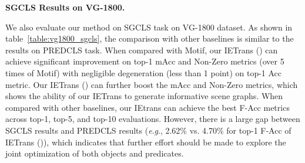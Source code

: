 \documentclass[runningheads]{llncs}
\newcommand{\eg}{\textit{e}.\textit{g}.}
\begin{document}
\smallskip
\noindent
\textbf{SGCLS Results on VG-1800.}
\begin{table*}
    \caption{SGCLS triplet-level evaluation results on VG-1800 dataset.}
    \begin{center}
    \small
    \end{center}
    \label{table:vg1800_sgcls}
\end{table*}
We also evaluate our method on SGCLS task on VG-1800 dataset.
As shown in table~\ref{table:vg1800_sgcls}, the comparison with other baselines is similar to the results on PREDCLS task.
When compared with Motif, our IETrans () can achieve significant improvement on top-1 mAcc and Non-Zero metrics (over 5 times of Motif) with negligible degeneration (less than 1 point) on top-1 Acc metric.
Our IETrans () can further boost the mAcc and Non-Zero metrics, which shows the ability of our IETrans to generate informative scene graphs.
When compared with other baselines, our IEtrans can achieve the best F-Acc metrics across top-1, top-5, and top-10 evaluations.
However, there is a large gap between SGCLS results and PREDCLS results (\eg, 2.62\% vs. 4.70\% for top-1 F-Acc of IETrans ()), which indicates that further effort should be made to explore the joint optimization of both objects and predicates.
\end{document}
